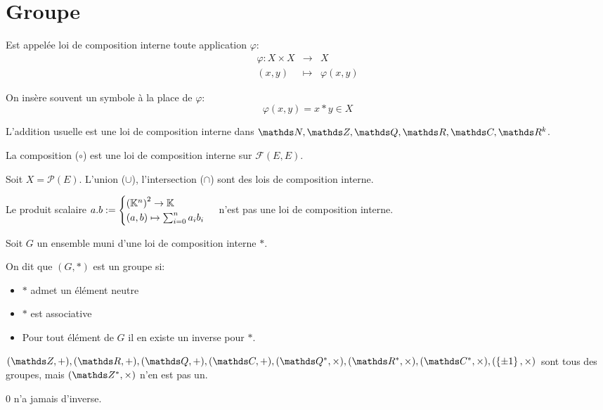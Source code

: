 \section{Groupe}
  \begin{definition}
    Est appelée loi de composition interne toute application $\varphi$:\begin{eqnarray*}
      \varphi : X\times X &\rightarrow& X\\
                (x, y)    &\mapsto& \varphi(x,y)
  \end{eqnarray*}
  \end{definition}

  On insère souvent un symbole à la place de $\varphi$: \[
    \varphi(x,y) = x*y \in X
  \]

  L'addition usuelle est une loi de composition interne dans $\NN,\ZZ,\QQ,\RR,\CC,\RR^k$.

  La composition ($\circ$) est une loi de composition interne sur $\mathcal{F}(E,E)$.

  Soit $X = \mathcal{P}(E)$. L'union ($\cup$), l'intersection ($\cap$) sont des
  lois de composition interne.

  Le produit scalaire $a.b := \begin{cases} \left(\mathbb{K}^n\right)^2\to\mathbb{K}\\
                                            (a,b)\mapsto\sum_{i=0}^n a_i b_i
                               \end{cases}$ n'est pas une loi de composition interne.

\begin{definition}[Groupe]
  Soit $G$ un ensemble muni d'une loi de composition interne $*$.

  On dit que $(G,*)$ est un groupe si: \begin{itemize}
    \item $*$ admet un élément neutre
    \item $*$ est associative
    \item Pour tout élément de $G$ il en existe un inverse pour $*$.
  \end{itemize}
\end{definition}

$(\ZZ,+),(\RR,+),(\QQ,+),(\CC,+),(\QQ^*,\times),(\RR^*,\times),(\CC^*,\times),(\rdbrackets{\pm 1},\times)$
sont tous des groupes, mais $(\ZZ^*, \times)$ n'en est pas un.

$0$ n'a jamais d'inverse.

